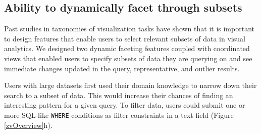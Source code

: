 \subsection{Ability to dynamically facet through subsets}
\par Past studies in taxonomies of visualization tasks have shown that it is important to design features that enable users to select relevant subsets of data in visual analytics\cite{Amar2005,Heer2012}. We designed two dynamic faceting features coupled with coordinated views that enabled users to specify subsets of data they are querying on and see immediate changes updated in the query, representative, and outlier results.

 Users with large datasets first used their domain knowledge to narrow down their search to a subset of data. This would increase their chances of finding an interesting pattern for a given query. To filter data, users could submit one or more SQL-like \texttt{WHERE} conditions as filter constraints in a text field (Figure \ref{zvOverview}h). 


